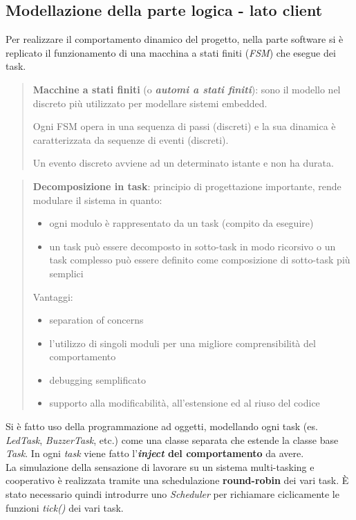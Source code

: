 \subsection{Modellazione della parte logica - lato client}
Per realizzare il comportamento dinamico del progetto, nella parte software si è replicato il funzionamento di una macchina a stati finiti (\textit{FSM}) che esegue dei task.

	\begin{quote}
		\textbf{Macchine a stati finiti} (o \textbf{\textit{automi a stati finiti}}): sono il modello nel discreto più utilizzato per modellare sistemi embedded.
		
		Ogni FSM opera in una sequenza di passi (discreti) e la sua dinamica è caratterizzata da sequenze di eventi (discreti).
		
		Un evento discreto avviene ad un determinato istante e non ha durata.
	\end{quote}
	
	\begin{quote}
		\textbf{Decomposizione in task}: principio di progettazione importante, rende modulare il sistema in quanto:
		\begin{itemize}
			\item ogni modulo è rappresentato da un task (compito da eseguire)
			\item un task può essere decomposto in sotto-task in modo ricorsivo o un task complesso può essere definito come composizione di sotto-task più semplici
		\end{itemize}
		Vantaggi:
		\begin{itemize}
			\item separation of concerns
			\item l'utilizzo di singoli moduli per una migliore comprensibilità del comportamento
			\item debugging semplificato
			\item supporto alla modificabilità, all'estensione ed al riuso del codice
		\end{itemize}
	\end{quote}	
Si è fatto uso della programmazione ad oggetti, modellando ogni task (es. \textit{LedTask}, \textit{BuzzerTask}, etc.) come una classe separata che estende la classe base \textit{Task}. In ogni \textit{task} viene fatto l'\textbf{\textit{inject} del comportamento} da avere.\\
La simulazione della sensazione di lavorare su un sistema multi-tasking e cooperativo è realizzata tramite una schedulazione \textbf{round-robin} dei vari task. È stato necessario quindi introdurre uno \textit{Scheduler} per richiamare ciclicamente le funzioni \textit{tick()} dei vari task.

